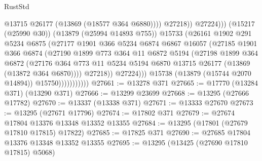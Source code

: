 \begin{lexlean}{RustStd}
\begin{coremodule}
                                          @13715
                                          @26177
                                          (@13869 (@18577 @364 @6880))))
                                      @27218))
                                  @27224)))
                            (@15217 (@25990 @30))
                            (@13879 (@25994 @14893 @755))
                            @15733
                            (@26161
                              @1902
                              @291
                              @5234
                              @6875
                              (@27177
                                @1901
                                @366
                                @5234
                                @6874
                                @6867
                                @16057
                                (@27185
                                  @1901
                                  @366
                                  @6874
                                  (@27190
                                    @1899
                                    @773
                                    @364
                                    @11
                                    @6872
                                    @5194
                                    (@27198
                                      @1899
                                      @364
                                      @6872
                                      (@27176
                                        @364
                                        @773
                                        @11
                                        @5234
                                        @5194
                                        @6870
                                        @13715
                                        @26177
                                        (@13869 (@13872 @364 @6870))))
                                    @27218))
                                @27224)))
                          @15738
                          (@13879 (@15744 @2070 @14894))
                          @15750)))))))))))
@27661 := @13278 @371
@27665 := @17770 (@13284 @371) (@13290 @371)
@27666 := @13299 @23699
@27668 := @13295 (@27666 @17782)
@27670 := @13337 (@13338 @371)
@27671 := @13333 @27670
@27673 := @13295 (@27671 @17796)
@27674 := @17802 @371
@27679 := @27674 @17804 @13376 @13348 @13352 @13355
@27684 := @13295 (@17801 (@27679 @17810 @17815) @17822)
@27685 := @17825 @371
@27690 := @27685 @17804 @13376 @13348 @13352 @13355
@27695 := @13295 (@13425 (@27690 @17810 @17815) @5068)

\end{coremodule}
\end{lexlean}
